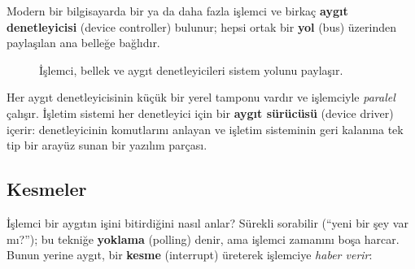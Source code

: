 \documentclass[11pt,a4paper]{article}
\newcommand{\term}[1]{\textbf{\color{mintdeep}#1}}
\begin{document}
Modern bir bilgisayarda bir ya da daha fazla işlemci ve birkaç \term{aygıt denetleyicisi} (device controller) bulunur; hepsi ortak bir \term{yol} (bus) üzerinden paylaşılan ana belleğe bağlıdır.

\begin{figure}[H]
\centering
{}
\caption{İşlemci, bellek ve aygıt denetleyicileri sistem yolunu paylaşır.}
\end{figure}

Her aygıt denetleyicisinin küçük bir yerel tamponu vardır ve işlemciyle \emph{paralel} çalışır. İşletim sistemi her denetleyici için bir \term{aygıt sürücüsü} (device driver) içerir: denetleyicinin komutlarını anlayan ve işletim sisteminin geri kalanına tek tip bir arayüz sunan bir yazılım parçası.

\subsection{Kesmeler}

İşlemci bir aygıtın işini bitirdiğini nasıl anlar? Sürekli sorabilir (``yeni bir şey var mı?''); bu tekniğe \term{yoklama} (polling) denir, ama işlemci zamanını boşa harcar. Bunun yerine aygıt, bir \term{kesme} (interrupt) üreterek işlemciye \emph{haber verir}:
\end{document}
